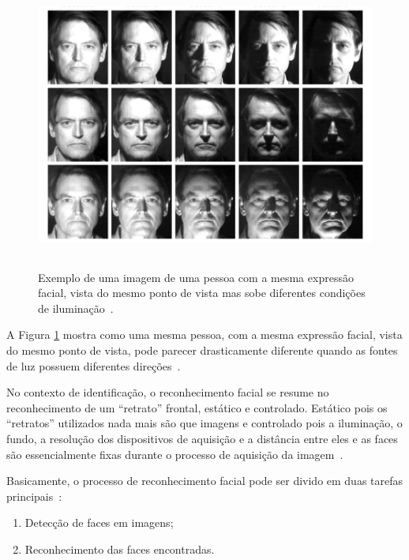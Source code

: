 	\begin{figure}[htb]
		\begin{center}
			\includegraphics[height=9.5cm,width=12.5cm]{figuras/2.FundamentacaoTeorica/diferencailuminacao.png}
		\end{center}
		\caption{Exemplo de uma imagem de uma pessoa com a mesma expressão facial, vista do mesmo ponto de vista mas sobe diferentes condições de iluminação~\cite{belhumeur}.}
		\label{diferencailuminacao}
	\end{figure}

	A Figura \ref{diferencailuminacao} mostra como uma mesma pessoa,
	com a mesma expressão facial, vista do mesmo ponto de vista, pode parecer
	drasticamente diferente quando as fontes de luz possuem diferentes
	direções~\cite{belhumeur}.
	
	No contexto de identificação, o reconhecimento facial se resume no
	reconhecimento de um ``retrato'' frontal, estático e controlado. Estático pois
	os ``retratos'' utilizados nada mais são que imagens e controlado pois a iluminação, o fundo, a
	resolução dos dispositivos de aquisição e a distância entre eles e as faces são
	essencialmente fixas durante o processo de aquisição da imagem~\cite{hong}.
	
	Basicamente, o processo de reconhecimento facial pode ser divido em duas tarefas
	principais~\cite{hong}:

	\begin{enumerate}
		\item Detecção de faces em imagens;
		\item Reconhecimento das faces encontradas.
	\end{enumerate}


